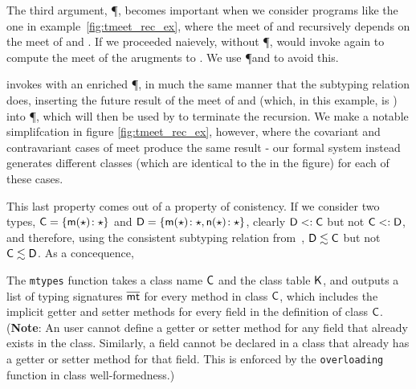 \documentclass[a4paper,USenglish]{tex/lipics-v2016}
\begin{document}
The third argument, \P, becomes important when we consider programs like the one in example~\ref{fig:tmeet_rec_ex}, where the meet 
of  and  recursively depends on the meet of  and . If we proceeded naievely, without \P,  would
invoke  again to compute the meet of the arugments to \m. We use \P and  to avoid this.

 invokes  with an enriched \P, in much the same manner that the subtyping relation does, inserting the future
result of the meet of  and  (which, in this example, is ) into \P, which will then be used by  to terminate
the recursion. We make a notable simplifcation in figure \ref{fig:tmeet_rec_ex}, however, where the covariant and contravariant cases of meet
produce the same result - our formal system instead generates different classes (which are identical to the  in the figure) for each of 
these cases.

This last property comes out of a property of conistency. If we consider two types, ${\sf{C}} = \{ {{\sf{m}}(\star)}\!:{\star}\}$ and ${\sf{D}} = \{ {{\sf{m}}(\star)}\!:{\star},  {{\sf{n}}(\star)}\!:{\star}\}$, clearly ${\sf{D}} <: {\sf{C}}$ but not ${\sf{C}} <: {\sf{D}}$, and therefore, using the consistent subtyping relation from~\cite{SiekTaha07}, 
${\sf{D}} \lesssim {\sf{C}}$ but not ${\sf{C}} \lesssim {\sf{D}}$. As a concequence, 

The \texttt{mtypes} function takes a class name ${\sf{C}}$ and the class table
${\sf{K}}$, and outputs a list of typing signatures $\overline{{\sf{mt}}}$ for every method in
class ${\sf{C}}$, which includes the implicit getter and setter methods for every
field in the definition of class ${\sf{C}}$.  (\textbf{Note}: An user cannot
define a getter or setter method for any field that already exists in the
class. Similarly, a field cannot be declared in a class that already has a
getter or setter method for that field. This is enforced by the
\texttt{overloading} function in class well-formedness.)
\end{document}

